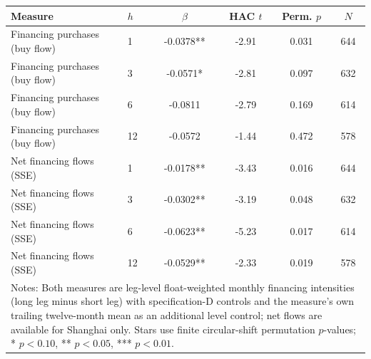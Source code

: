 \begingroup\small\setlength{\tabcolsep}{2.5pt}
\begin{tabular}{llcccc}
\toprule
Measure & $h$ & $\beta$ & HAC $t$ & Perm. $p$ & $N$ \\
\midrule
Financing purchases (buy flow) & 1 & -0.0378** & -2.91 & 0.031 & 644 \\
Financing purchases (buy flow) & 3 & -0.0571* & -2.81 & 0.097 & 632 \\
Financing purchases (buy flow) & 6 & -0.0811 & -2.79 & 0.169 & 614 \\
Financing purchases (buy flow) & 12 & -0.0572 & -1.44 & 0.472 & 578 \\
\midrule
Net financing flows (SSE) & 1 & -0.0178** & -3.43 & 0.016 & 644 \\
Net financing flows (SSE) & 3 & -0.0302** & -3.19 & 0.048 & 632 \\
Net financing flows (SSE) & 6 & -0.0623** & -5.23 & 0.017 & 614 \\
Net financing flows (SSE) & 12 & -0.0529** & -2.33 & 0.019 & 578 \\

\midrule
\multicolumn{6}{l}{\parbox{\dimexpr\textwidth-10pt\relax}{\footnotesize Notes: Both measures are leg-level float-weighted monthly financing intensities (long leg minus short leg) with specification-D controls and the measure's own trailing twelve-month mean as an additional level control; net flows are available for Shanghai only. Stars use finite circular-shift permutation $p$-values; * $p<0.10$, ** $p<0.05$, *** $p<0.01$.}} \\
\bottomrule
\end{tabular}

\endgroup